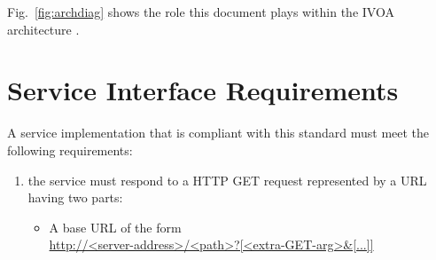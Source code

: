 \documentclass[11pt,a4paper]{ivoa}
\begin{document}
Fig.~\ref{fig:archdiag} shows the role this document plays within the
IVOA architecture \citep{note:VOARCH}.

\section{Service Interface Requirements}
\label{sec:2}

A service implementation that is compliant with this standard must meet the following requirements:

\begin{enumerate}
	\item the service must respond to a HTTP GET request represented by a URL having two parts:\\
	\begin{itemize}
		\item A base URL of the form\\
		
		\url{http://<server-address>/<path>?[<extra-GET-arg>&[...]]}\\
		

\end{itemize}
\end{enumerate}
\end{document}
